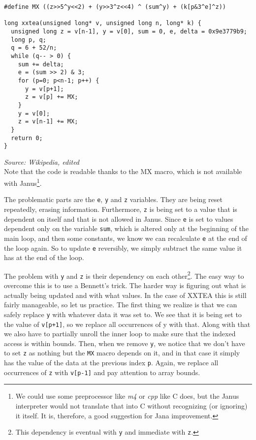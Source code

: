 \documentclass[a4paper,10pt,openright]{memoir}
\newcommand{\term}[1]{\textit{#1}}
\newcommand{\code}[1]{\texttt{#1}}
\begin{document}
\begin{lstlisting}
#define MX ((z>>5^y<<2) + (y>>3^z<<4) ^ (sum^y) + (k[p&3^e]^z))

long xxtea(unsigned long* v, unsigned long n, long* k) {
  unsigned long z = v[n-1], y = v[0], sum = 0, e, delta = 0x9e3779b9;
  long p, q;
  q = 6 + 52/n;
  while (q-- > 0) {
    sum += delta;
    e = (sum >> 2) & 3;
    for (p=0; p<n-1; p++) {
      y = v[p+1];
      z = v[p] += MX;
    }
    y = v[0];
    z = v[n-1] += MX;
  }
  return 0;
}
\end{lstlisting}
\textit{\footnotesize Source: Wikipedia, edited}\\

Note that the code is readable thanks to the MX macro, which is not 
available with Janus\footnote{We could use some preprocessor like 
\term{m4} or \term{cpp} like C does, but the Janus interpreter would 
not translate that into C without recognizing (or ignoring) it 
itself. It is, therefore, a good suggestion for Jana improvement.}.

The problematic parts are the \code{e}, \code{y} and \code{z} 
variables. They are being reset repeatedly, erasing information. 
Furthermore, \code{z} is being set to a value that is dependent on 
itself and that is not allowed in Janus. Since \code{e} is set to 
values dependent only on the variable \code{sum}, which is altered only 
at the beginning of the main loop, and then some constants, we know we 
can recalculate \code{e} at the end of the loop again. So to update 
\code{e} reversibly, we simply subtract the same value it has at the 
end of the loop.

The problem with \code{y} and \code{z} is their dependency on each 
other\footnote{This dependency is eventual with \code{y} and immediate 
with \code{z}.}. The easy way to overcome this is to use a Bennett's 
trick. The harder way is figuring out what is actually being updated 
and with what values. In the case of XXTEA this is still fairly 
manageable, so let us practice. The first thing we realize is that we 
can safely replace \code{y} with whatever data it was set to. We see 
that it is being set to the value of \code{v[p+1]}, so we replace all 
occurrences of y with that. Along with that we also have to partially 
unroll the inner loop to make sure that the indexed access is within 
bounds. Then, when we remove \code{y}, we notice that we don't have to 
set \code{z} as nothing but the \code{MX} macro depends on it, and in 
that case it simply has the value of the data at the previous index 
\code{p}. Again, we replace all occurrences of \code{z} with 
\code{v[p-1]} and pay attention to array bounds.
\end{document}
